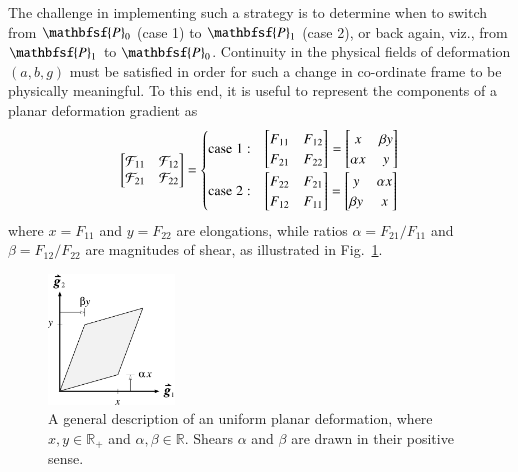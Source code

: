 The challenge in implementing such a strategy is to determine when to switch from $\mathbfsf{P}_0$ (case 1) to $\mathbfsf{P}_1$ (case 2), or back again, viz., from $\mathbfsf{P}_1$ to $\mathbfsf{P}_0$.  Continuity in the physical fields of deformation $(a , b , g )$ must be satisfied in order for such a change in co-ordinate frame to be physically meaningful.  To this end, it is useful to represent the components of a planar deformation gradient as
\begin{equation}
\begin{bmatrix}
\mathcal{F}_{11} & \mathcal{F}_{12} \\
\mathcal{F}_{21} & \mathcal{F}_{22}
\end{bmatrix} =
\begin{cases}
\mathrm{case} \; 1: & \begin{bmatrix}
F_{11} & F_{12} \\
F_{21} & F_{22}
\end{bmatrix}_{\vphantom{|}} = \begin{bmatrix}
x & \beta y \\ \alpha x & y
\end{bmatrix} \\
\mathrm{case} \; 2: & \begin{bmatrix}
F_{22} & F_{21} \\
F_{12} & F_{11}
\end{bmatrix} = \begin{bmatrix}
y & \alpha x \\ \beta y & x
\end{bmatrix}
\end{cases}
\label{deformationGradientRelabelling}
\end{equation}
where $x = F_{11}$ and $y = F_{22}$ are elongations, while ratios $\alpha = F_{21} / F_{11}$ and $\beta = F_{12} / F_{22}$ are magnitudes of shear, as illustrated in Fig.~\ref{figF}.  

\begin{figure}
	\centering
	\includegraphics[width=0.3\textwidth]{figures/figF.pdf}
	\caption{A general description of an uniform planar deformation, where $x , y \in \mathbb{R}_+$ and $\alpha , \beta \in \mathbb{R}$.  Shears $\alpha$ and $\beta$ are drawn in their positive sense.}
	\label{figF}
\end{figure}

